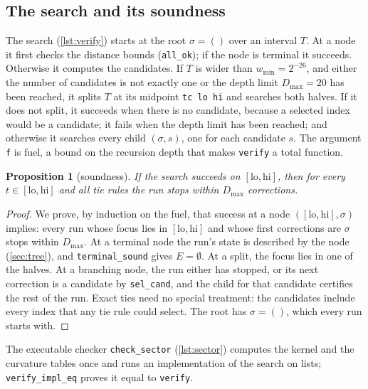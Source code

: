 \documentclass[11pt]{amsart}
\theoremstyle{plain}
\newtheorem{proposition}[lemma]{Proposition}
\theoremstyle{definition}
\newcommand{\thy}[1]{\texttt{#1}}
\newcommand{\El}{E}
\begin{document}
\subsection{The search and its soundness}\label{sec:search}

The search (\cref{lst:verify}) starts at the root $\sigma = ()$ over an interval $T$.  At a node it
first checks the distance bounds (\thy{all\_ok}); if the node is terminal it succeeds.  Otherwise
it computes the candidates.  If $T$ is wider than $w_{\min} = 2^{-26}$, and either the number of
candidates is not exactly one or the depth limit $D_{\max} = 20$ has been reached, it splits $T$ at
its midpoint \thy{tc lo hi} and searches both halves.  If it does not split, it succeeds when there
is no candidate, because a selected index would be a candidate; it fails when the depth limit has
been reached; and otherwise it searches every child $(\sigma, s)$, one for each candidate $s$.  The argument \thy{f} is fuel, a bound on the recursion depth that makes \thy{verify}
a total function.



\begin{proposition}[soundness]\label{prop:sound}
If the search succeeds on $[\mathrm{lo}, \mathrm{hi}]$, then for every $t \in [\mathrm{lo}, \mathrm{hi}]$
and all tie rules the run stops within $D_{\max}$ corrections.
\end{proposition}

\begin{proof}
We prove, by induction on the fuel, that success at a node $([\mathrm{lo},\mathrm{hi}], \sigma)$
implies: every run whose focus lies in $[\mathrm{lo},\mathrm{hi}]$ and whose first corrections are
$\sigma$ stops within $D_{\max}$.  At a terminal node the run's state is described by the node
(\cref{sec:tree}), and \thy{terminal\_sound} gives $\El = \emptyset$.  At a split, the focus lies in
one of the halves.  At a branching node, the run either has stopped, or its next correction is a
candidate by \thy{sel\_cand}, and the child for that candidate certifies the rest of the run.  Exact
ties need no special treatment: the candidates include every index that any tie rule could select.
The root has $\sigma = ()$, which every run starts with.
\end{proof}

The executable checker \thy{check\_sector} (\cref{lst:sector}) computes the kernel and the curvature
tables once and runs an implementation of the search on lists; \thy{verify\_impl\_eq} proves it equal
to \thy{verify}.
\end{document}
